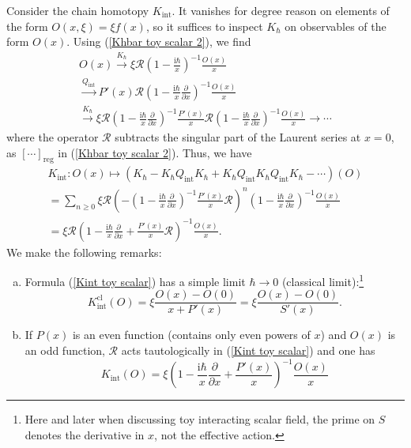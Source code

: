\documentclass{amsart}
\theoremstyle{plain} %
\theoremstyle{definition}
\theoremstyle{remark}
\newcommand{\mc}{\mathcal}
\newcommand{\mr}{\mathrm}
\newcommand{\ra}{\rightarrow}
\newcommand{\bl}{\color{blue}}
\newcommand{\xra}{\xrightarrow}
\newcommand{\dd}{\partial}
\newcommand{\ii}{\mathrm{int}}
\newcommand{\iii}{\mathrm{i}}
\newcommand{\cl}{\mathrm{cl}}
\begin{document}
    Consider the chain homotopy $K_\ii$. %
    It vanishes for degree reason on elements of the form $O(x,\xi)=\xi f(x)$, so it suffices to inspect $K_\hbar$ on observables of the form $O(x)$. Using (\ref{Khbar toy scalar 2}), we find
    \begin{multline}
        O(x)\xra{K_\hbar} \xi \mc{R}\left(1-\frac{\iii\hbar}{x} %
        \right)^{-1}\frac{O(x)}{x} \\
        \xra{Q_\ii} 
        P'(x) \mc{R} \left(1-\frac{\iii\hbar}{x} \frac{\dd}{\dd x}\right)^{-1}\frac{O(x)}{x}\\
        \xra{K_\hbar}
        \xi \mc{R}\left(1-\frac{\iii\hbar}{x} \frac{\dd}{\dd x}\right)^{-1}\frac{P'(x)}{x} \mc{R}\left(1-\frac{\iii\hbar}{x} \frac{\dd}{\dd x}\right)^{-1}\frac{O(x)}{x} \ra\cdots
    \end{multline}
    where the operator $\mc{R}$ subtracts the singular part of the Laurent series at $x=0$, as $[\cdots]_\mr{reg}$ in (\ref{Khbar toy scalar 2}). Thus, we have
    \begin{multline}\label{Kint toy scalar}
        K_\ii\colon O(x)\mapsto (K_\hbar-K_\hbar Q_\ii K_\hbar+K_\hbar Q_\ii K_\hbar Q_\ii K_\hbar-\cdots)(O)\\
        =\sum_{n\geq 0} \xi \mc{R}\left(-\left(1-\frac{\iii\hbar}{x} \frac{\dd}{\dd x}\right)^{-1}\frac{P'(x)}{x}\mc{R}\right)^n \left(1-\frac{\iii\hbar}{x} \frac{\dd}{\dd x}\right)^{-1}\frac{O(x) }{x}\\
        =\xi \mc{R}\left(1-\frac{\iii\hbar}{x}\frac{\dd}{\dd x}+\frac{P'(x)}{x}\mc{R} \right)^{-1}\frac{O(x)}{x} .
    \end{multline}
We make the following remarks:
\begin{enumerate}[(a)]
\item Formula (\ref{Kint toy scalar}) has a simple limit $\hbar\ra 0$ (classical limit):\footnote{Here and later when discussing toy interacting scalar field, the prime on $S$ denotes the derivative in $x$, not the effective action.} 
\begin{equation}
    K_\ii^\cl(O)=\xi \frac{O(x)-O(0)}{x+P'(x)}=\xi \frac{O(x)-O(0)}{ S'(x)}.
\end{equation}
    \item If $P(x)$ is an even function (contains only even powers of $x$) and $O(x)$ is an odd function, $\mc{R}$ acts tautologically in (\ref{Kint toy scalar}) and one has
    \begin{equation}\label{Kint toy scalar for S even, O odd}
        K_\ii(O)= \xi \left(1-\frac{\iii\hbar}{x}\frac{\dd}{\dd x}+\frac{P'(x)}{x} \right)^{-1}\frac{O(x)}{x} 
    \end{equation}
\end{enumerate}
\end{document}
